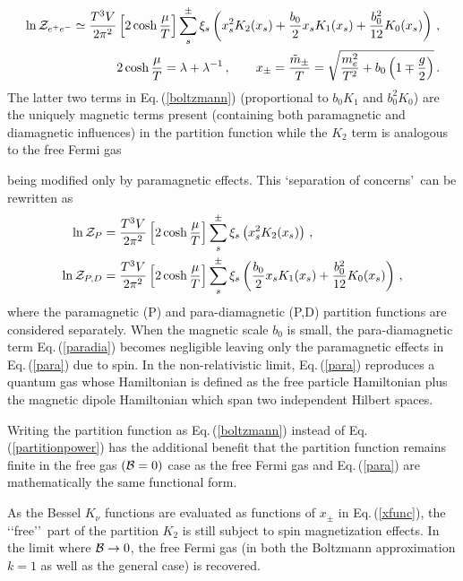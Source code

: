 \documentclass[a4paper]{article}
\newcommand{\req}[1]{Eq.\,(\ref{#1})}
\newcommand*{\xblue}{\color{black}}
\begin{document}
\begin{align}
    \label{boltzmann}
    \ln{\cal Z}_{e^{+}e^{-}}\simeq\frac{T^{3}V}{2\pi^{2}}\left[2\cosh{\frac{\mu}{T}}\right]\sum_{s}^{\pm}\xi_{s}\left(x_{s}^{2}K_{2}(x_{s})+\frac{b_{0}}{2}x_{s}K_{1}(x_{s})+\frac{b_{0}^{2}}{12}K_{0}(x_{s})\right)\,,\\
    \label{xfunc}
    2\cosh{\frac{\mu}{T}}=\lambda+\lambda^{-1}\,,\qquad
    x_{\pm}=\frac{{\tilde m}_{\pm}}{T}=\sqrt{\frac{m_{e}^{2}}{T^{2}}+b_{0}\left(1\mp\frac{g}{2}\right)}\,.
\end{align}
The latter two terms in \req{boltzmann} (proportional to $b_{0}K_{1}$ and $b_{0}^{2}K_{0}$) are the uniquely magnetic terms present (containing both paramagnetic and diamagnetic influences) in the partition function while the $K_{2}$ term is analogous to the free Fermi gas~\cite{greiner2012thermodynamics} {\xblue being modified only by paramagnetic effects. This \lq separation of concerns\rq\ can be rewritten as
\begin{align}
    \label{para}
    \ln{\cal Z}_{P}&=\frac{T^{3}V}{2\pi^{2}}\left[2\cosh{\frac{\mu}{T}}\right]\sum_{s}^{\pm}\xi_{s}\left(x_{s}^{2}K_{2}(x_{s})\right)\,,\\
    \label{paradia}
    \ln{\cal Z}_{P,D}&=\frac{T^{3}V}{2\pi^{2}}\left[2\cosh{\frac{\mu}{T}}\right]\sum_{s}^{\pm}\xi_{s}\left(\frac{b_{0}}{2}x_{s}K_{1}(x_{s})+\frac{b_{0}^{2}}{12}K_{0}(x_{s})\right)\,,
\end{align}
where the paramagnetic (P) and para-diamagnetic (P,D) partition functions are considered separately. When the magnetic scale $b_{0}$ is small, the para-diamagnetic term \req{paradia} becomes negligible leaving only the paramagnetic effects in \req{para} due to spin. In the non-relativistic limit, \req{para} reproduces a quantum gas whose Hamiltonian is defined as the free particle Hamiltonian plus the magnetic dipole Hamiltonian which span two independent Hilbert spaces.

Writing the partition function as \req{boltzmann} instead of \req{partitionpower} has the additional benefit that the partition function remains finite in the free gas $({\cal B}=0)$ case as the free Fermi gas and \req{para} are mathematically the same functional form.} As the Bessel $K_{\nu}$ functions are evaluated as functions of $x_{\pm}$ in \req{xfunc}, the \lq\lq free\rq\rq\ part of the partition $K_{2}$ is still subject to spin magnetization effects. {\xblue In the limit where ${\cal B}\rightarrow0$, the free Fermi gas (in both the Boltzmann approximation $k=1$ as well as the general case) is recovered.}
\end{document}
